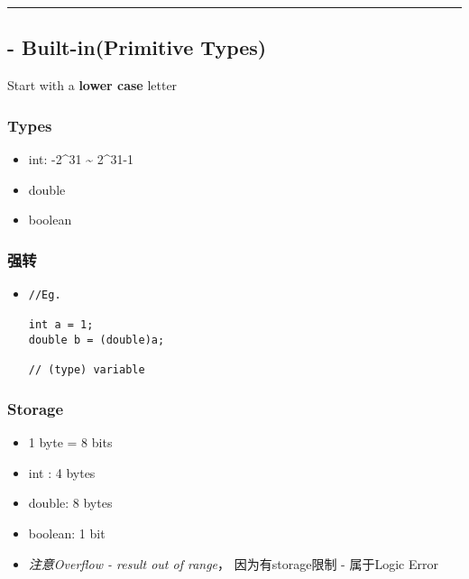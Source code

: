 \documentclass[
  paper=a4,
  ,captions=tableheading
]{scrartcl}
\begin{document}
\begin{center}\rule{0.5\linewidth}{\linethickness}\end{center}

\hypertarget{built-inprimitive-types}{%
\subsection{- Built-in(Primitive Types)}\label{built-inprimitive-types}}

Start with a \textbf{lower case} letter

\hypertarget{types}{%
\subsubsection{Types}\label{types}}

\begin{itemize}
\item
  int: -2\^{}31 \textasciitilde{} 2\^{}31-1
\item
  double
\item
  boolean
\end{itemize}

\hypertarget{ux5f3aux8f6c}{%
\subsubsection{强转}\label{ux5f3aux8f6c}}

\begin{itemize}
\item
\begin{verbatim}
//Eg.

int a = 1;
double b = (double)a; 

// (type) variable
\end{verbatim}
\end{itemize}

\hypertarget{storage}{%
\subsubsection{Storage}\label{storage}}

\begin{itemize}
\item
  1 byte = 8 bits
\item
  int : 4 bytes
\item
  double: 8 bytes
\item
  boolean: 1 bit
\item
  \emph{注意Overflow - result out of range}， 因为有storage限制 -
  属于Logic Error
\end{itemize}
\end{document}

